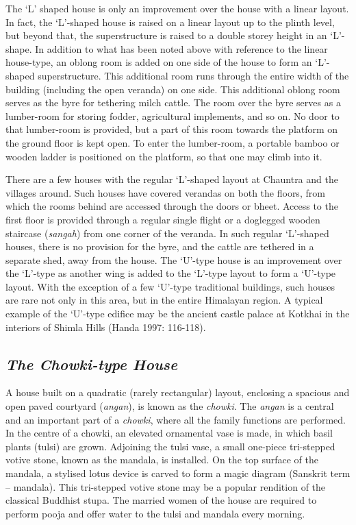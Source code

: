 The ‘L’ shaped house is only an improvement over the house with a linear layout. In fact, the ‘L’-shaped house is raised on a linear layout up to the plinth level, but beyond that, the superstructure is raised to a double storey height in an ‘L’-shape. In addition to what has been noted above with reference to the linear house-type, an oblong room is added on one side of the house to form an ‘L’-shaped superstructure. This additional room runs through the entire width of the building (including the open veranda) on one side. This additional oblong room serves as the byre for tethering milch cattle. The room over the byre serves as a lumber-room for storing fodder, agricultural implements, and so on. No door to that lumber-room is provided, but a part of this room towards the platform on the ground floor is kept open. To enter the lumber-room, a portable bamboo or wooden ladder is positioned on the platform, so that one may climb into it.

\newpage

There are a few houses with the regular ‘L’-shaped layout at Chauntra and the villages around. Such houses have covered verandas on both the floors, from which the rooms behind are accessed through the doors or bheet. Access to the first floor is provided through a regular single flight or a doglegged wooden staircase (\textit{sangah}) from one corner of the veranda. In such regular ‘L’-shaped houses, there is no provision for the byre, and the cattle are tethered in a separate shed, away from the house. The ‘U’-type house is an improvement over the ‘L’-type as another wing is added to the ‘L’-type layout to form a ‘U’-type layout. With the exception of a few ‘U’-type traditional buildings, such houses are rare not only in this area, but in the entire Himalayan region. A typical example of the ‘U’-type edifice may be the ancient castle palace at Kotkhai in the interiors of Shimla Hills (Handa 1997: 116-118).


\subsection*{\textit{The Chowki-type House}}

A house built on a quadratic (rarely rectangular) layout, enclosing a spacious and open paved courtyard (\textit{angan}), is known as the \textit{chowki}. The \textit{angan} is a central and an important part of a \textit{chowki}, where all the family functions are performed. In the centre of a chowki, an elevated ornamental vase is made, in which basil plants (tulsi) are grown. Adjoining the tulsi vase, a small one-piece tri-stepped votive stone, known as the mandala, is installed. On the top surface of the mandala, a stylised lotus device is carved to form a magic diagram (Sanskrit term – mandala). This tri-stepped votive stone may be a popular rendition of the classical Buddhist stupa. The married women of the house are required to perform pooja and offer water to the tulsi and mandala every morning.


